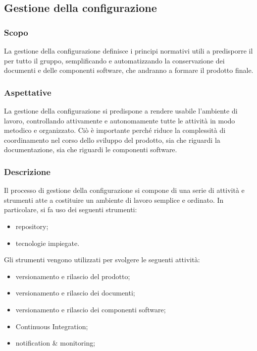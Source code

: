 \subsection{Gestione della configurazione}


\subsubsection{Scopo}

La gestione della configurazione definisce i principi normativi utili a predisporre il  per tutto il gruppo, semplificando e automatizzando la conservazione dei documenti e delle componenti software, che andranno a formare il prodotto finale.

\subsubsection{Aspettative}

La gestione della configurazione si predispone a rendere usabile l'ambiente di lavoro, controllando attivamente e autonomamente tutte le attività in modo metodico e organizzato. Ciò è importante perché riduce la complessità di coordinamento nel corso dello sviluppo del prodotto, sia che riguardi la documentazione, sia che riguardi le componenti software.

\subsubsection{Descrizione}

Il processo di gestione della configurazione si compone di una serie di attività e strumenti atte a costituire un ambiente di lavoro semplice e ordinato. 
In particolare, si fa uso dei seguenti strumenti:
\begin{itemize}
	\item repository;
	\item tecnologie impiegate.
\end{itemize}
Gli strumenti vengono utilizzati per svolgere le seguenti attività:
\begin{itemize}
	\item versionamento e rilascio del prodotto;
	\item versionamento e rilascio dei documenti;
	\item versionamento e rilascio dei componenti software;
	\item Continuous Integration;
	\item notification \& monitoring;
\end{itemize}



